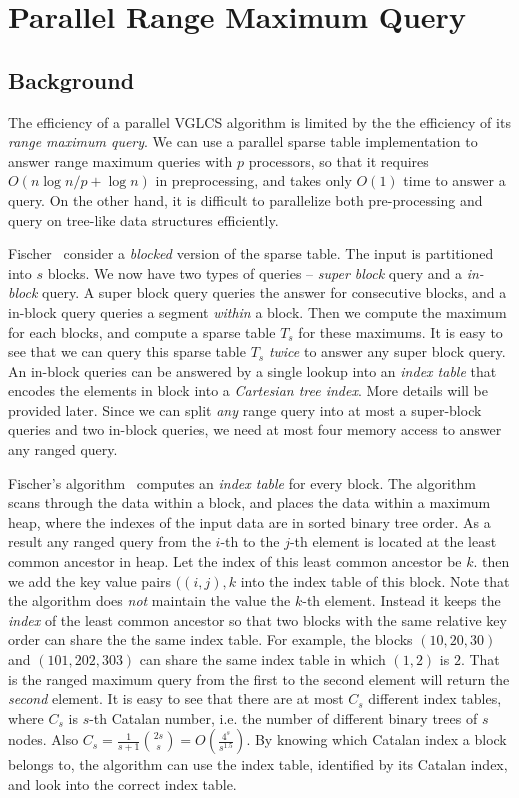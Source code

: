 \section{Parallel Range Maximum Query}
\label{sec:parallelRMQ}

\subsection{Background}

The efficiency of a parallel VGLCS algorithm is limited by the the
efficiency of its {\em range maximum query}.  We can use a parallel
sparse table implementation to answer range maximum queries with $p$
processors, so that it requires $O(n \log n / p + \log n)$ in
preprocessing, and takes only $O(1)$ time to answer a query.  On the
other hand, it is difficult to parallelize both pre-processing and
query on tree-like data structures efficiently.

Fischer~\cite{Fischer2006TheoreticalAP} consider a {\em blocked}
version of the sparse table.  The input is partitioned into $s$ blocks.
We now have two types of queries -- {\em super block} query and a {\em
  in-block} query.  A super block query queries the answer for
consecutive blocks, and a in-block query queries a segment {\em
  within} a block.  Then we compute the maximum for each blocks, and
compute a sparse table $T_s$ for these maximums.  It is easy to see
that we can query this sparse table $T_s$ {\em twice} to answer any
super block query.  An in-block queries can be answered by a single
lookup into an {\em index table} that encodes the elements in block
into a {\em Cartesian tree index}.  More details will be provided
later.  Since we can split {\em any} range query into at most a
super-block queries and two in-block queries, we need at most four
memory access to answer any ranged query.

Fischer's algorithm~\cite{Fischer2006TheoreticalAP} computes an {\em
  index table} for every block.  The algorithm scans through the data
within a block, and places the data within a maximum heap, where the
indexes of the input data are in sorted binary tree order.  As a
result any ranged query from the $i$-th to the $j$-th element is
located at the least common ancestor in heap.  Let the index of this
least common ancestor be $k$. then we add the key value pairs $((i,
j), k$ into the index table of this block.  Note that the algorithm
does {\em not} maintain the value the $k$-th element.  Instead it
keeps the {\em index} of the least common ancestor so that two blocks
with the same relative key order can share the the same index table.
For example, the blocks $(10, 20, 30)$ and $(101, 202, 303)$ can share
the same index table in which $(1, 2)$ is $2$.  That is the ranged
maximum query from the first to the second element will return the
{\em second} element.  It is easy to see that there are at most $C_s$
different index tables, where $C_s$ is $s$-th Catalan number, i.e. the
number of different binary trees of $s$ nodes.  Also $C_s =
\frac{1}{s+1}\binom{2s}{s} = O(\frac{4^s}{s^{1.5}})$.  By knowing
which Catalan index a block belongs to, the algorithm can use the
index table, identified by its Catalan index, and look into the
correct index table.


